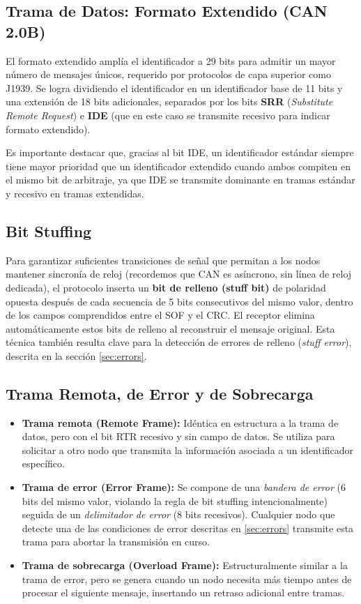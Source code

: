 \documentclass[pdflatex,sn-mathphys-num]{sn-jnl}%
\begin{document}
\subsection{Trama de Datos: Formato Extendido (CAN 2.0B)}
El formato extendido amplía el identificador a 29 bits para admitir un mayor número de mensajes únicos, requerido por protocolos de capa superior como J1939. Se logra dividiendo el identificador en un identificador base de 11 bits y una extensión de 18 bits adicionales, separados por los bits \textbf{SRR} (\textit{Substitute Remote Request}) e \textbf{IDE} (que en este caso se transmite recesivo para indicar formato extendido).

Es importante destacar que, gracias al bit IDE, un identificador estándar siempre tiene mayor prioridad que un identificador extendido cuando ambos compiten en el mismo bit de arbitraje, ya que IDE se transmite dominante en tramas estándar y recesivo en tramas extendidas.

\subsection{Bit Stuffing}
Para garantizar suficientes transiciones de señal que permitan a los nodos mantener sincronía de reloj (recordemos que CAN es asíncrono, sin línea de reloj dedicada), el protocolo inserta un \textbf{bit de relleno (stuff bit)} de polaridad opuesta después de cada secuencia de 5 bits consecutivos del mismo valor, dentro de los campos comprendidos entre el SOF y el CRC. El receptor elimina automáticamente estos bits de relleno al reconstruir el mensaje original. Esta técnica también resulta clave para la detección de errores de relleno (\textit{stuff error}), descrita en la sección \ref{sec:errors}.

\subsection{Trama Remota, de Error y de Sobrecarga}
\begin{itemize}
    \item \textbf{Trama remota (Remote Frame):} Idéntica en estructura a la trama de datos, pero con el bit RTR recesivo y sin campo de datos. Se utiliza para solicitar a otro nodo que transmita la información asociada a un identificador específico.
    \item \textbf{Trama de error (Error Frame):} Se compone de una \textit{bandera de error} (6 bits del mismo valor, violando la regla de bit stuffing intencionalmente) seguida de un \textit{delimitador de error} (8 bits recesivos). Cualquier nodo que detecte una de las condiciones de error descritas en \ref{sec:errors} transmite esta trama para abortar la transmisión en curso.
    \item \textbf{Trama de sobrecarga (Overload Frame):} Estructuralmente similar a la trama de error, pero se genera cuando un nodo necesita más tiempo antes de procesar el siguiente mensaje, insertando un retraso adicional entre tramas.
\end{itemize}
\end{document}
